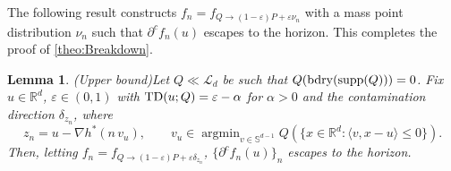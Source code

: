 \documentclass[11pt]{article}
\DeclareMathOperator*{\argmin}{argmin}
\newcommand{\RR}{\mathbb{R}}
\newcommand{\R}{\RR}
\theoremstyle{plain}
\newtheorem{lemma}[theorem]{Lemma}
\theoremstyle{definition}\newtheorem{definition}[theorem]{Definition}
\theoremstyle{remark}
\begin{document}
The following result constructs  $f_{n} = f_{Q \to (1-\varepsilon)P + \varepsilon \nu_n}$ with a mass point distribution $\nu_n$ such that $\partial^c f_n(u)$ escapes to the horizon. This completes the proof of \cref{theo:Breakdown}. 
%
\begin{lemma}(Upper bound)\label{lemma-Upper}
Let $Q \ll \mathcal{L}_d$ be such that $Q({\rm bdry}({\rm supp}(Q)))=0$.
Fix $u\in \R^d$,  $\varepsilon\in (0,1)$ with ${\rm TD}(u;Q)=\varepsilon-\alpha$ for $\alpha>0$ and the contamination direction $\delta_{z_n}$, where 
$$z_n=u- \nabla h^* ( n\, v_u), \quad\quad v_u\in \argmin_{v\in \mathbb{S}^{d-1}} Q(\{ x\in\mathbb{R}^d: \langle v, x-u\rangle \leq 0\}).$$ 
%
    Then, letting    $f_{n}= f_{Q\to (1-\varepsilon)P+\varepsilon \delta_{z_n} }$, 
 $\{\partial^c f_n(u)\}_n$ escapes to the horizon. 
\end{lemma}
%
\end{document}

